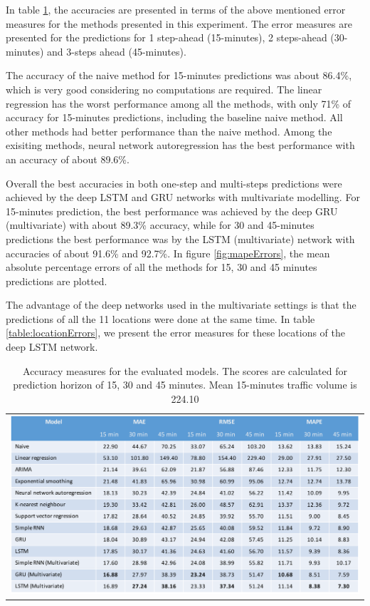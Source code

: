 In table \ref{table:accuracyScores}, the accuracies are presented in terms of the above mentioned
error measures for the methods presented in this experiment. The error measures are presented for
the predictions for 1 step-ahead (15-minutes), 2 steps-ahead (30-minutes) and 3-steps ahead (45-minutes).

The accuracy of the naive method for 15-minutes predictions was about 86.4\%, which is very good
considering no computations are required.
The linear regression has the worst performance among all the methods, with only 71\% of accuracy for
15-minutes predictions, including the baseline naive method. All other methods had better performance
than the naive method. Among the exisiting methods, neural network autoregression has the best
performance with an accuracy of about 89.6\%.

Overall the best accuracies in both one-step and multi-steps predictions were achieved by the deep
LSTM and GRU networks with multivariate modelling. For 15-minutes prediction, the best performance
was achieved by the deep GRU (multivariate) with about 89.3\% accuracy, while for 30 and 45-minutes
predictions the best performance was by the LSTM (multivariate) network with accuracies of about
91.6\% and 92.7\%.
In figure \ref{fig:mapeErrors}, the mean absolute percentage errors of all the methods for 15, 30
and 45 minutes predictions are plotted.

The advantage of the deep networks used in the multivariate settings is that the predictions of
all the 11 locations were done at the same time. In table \ref{table:locationErrors}, we present the
error measures for these locations of the deep LSTM network.

\begin{table}
    \begin{tabular}{c}
        \includegraphics[width=\textwidth,height=\textheight,keepaspectratio]{Figures/errors-table.pdf}
    \end{tabular}
    \caption[Model comparisons]{Accuracy measures for the evaluated models. The scores are
    calculated for prediction horizon of 15, 30 and 45 minutes. Mean 15-minutes traffic
    volume is 224.10}
    \label{table:accuracyScores}
\end{table}

